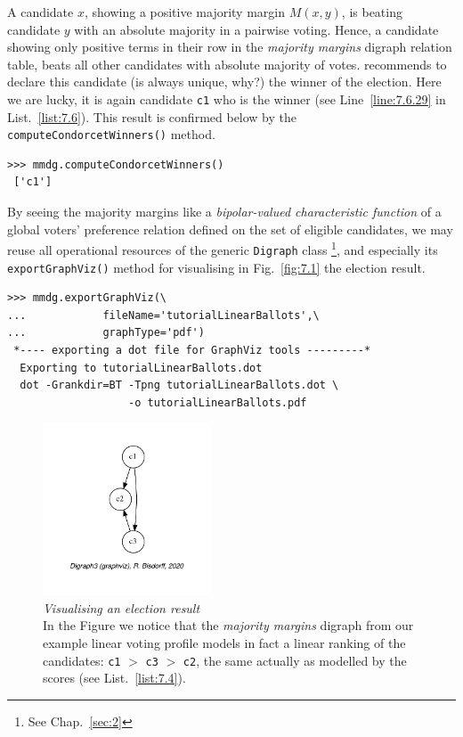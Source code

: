 A candidate $x$, showing a positive majority margin $M(x,y)$, is beating candidate $y$  with an absolute majority in a pairwise voting. Hence, a candidate showing only positive terms in their row in the \emph{majority margins} digraph relation table, beats all other candidates with absolute majority of votes. \Condorcet recommends to declare this candidate (is always unique, why?) the winner of the election. Here we are lucky, it is again candidate \texttt{c1} who is the \Condorcet winner (see Line~\ref{line:7.6.29} in List.~\vref{list:7.6}). This result is confirmed below by the \texttt{computeCondorcetWinners()} method. 
\begin{lstlisting}
>>> mmdg.computeCondorcetWinners()
 ['c1']  
\end{lstlisting}    

By seeing the majority margins like a \emph{bipolar-valued characteristic function} of a global voters' preference relation defined on the set of eligible candidates, we may reuse all operational resources of the generic \texttt{Digraph} class \footnote{See Chap.~\ref{sec:2}}, and especially its \texttt{exportGraphViz()} method for visualising in Fig.~\vref{fig:7.1} the election result.
\begin{lstlisting}
>>> mmdg.exportGraphViz(\
...            fileName='tutorialLinearBallots',\
...            graphType='pdf')
 *---- exporting a dot file for GraphViz tools ---------*
  Exporting to tutorialLinearBallots.dot
  dot -Grankdir=BT -Tpng tutorialLinearBallots.dot \
                   -o tutorialLinearBallots.pdf
\end{lstlisting}
\begin{figure}[ht]
\sidecaption[t]
\includegraphics[width=5cm]{Figures/7-1-tutorialBallots.pdf}
\caption[Visualising an election result]{\emph{Visualising an election result}\\ In the Figure we notice that the \emph{majority margins} digraph from our example linear voting profile models in fact a linear ranking of the candidates: \texttt{c1} $>$ \texttt{c3} $>$ \texttt{c2}, the same actually as modelled by the \Borda scores (see List.~\vref{list:7.4}).}
\label{fig:7.1}       %
\end{figure}

